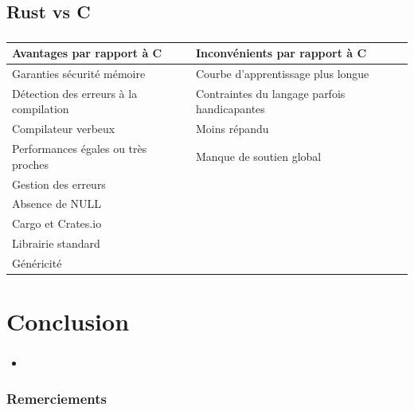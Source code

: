 \documentclass[10pt]{beamer}
\begin{document}
\subsection{Rust vs C}
\begin{frame}
    \frametitle{\subsecname}
    \begin{center}
        \begin{tabularx}{11cm}{|X|X|} \hline
            \textbf{Avantages par rapport à C} & \textbf{Inconvénients par rapport à C} \\ \hline
            Garanties sécurité mémoire & Courbe d'apprentissage plus longue \\ \hline
            Détection des erreurs à la compilation & Contraintes du langage parfois handicapantes \\ \hline
            Compilateur verbeux & Moins répandu \\ \hline
            Performances égales ou très proches & Manque de soutien global \\ \hline
            Gestion des erreurs &  \\ \hline
            Absence de NULL &  \\ \hline
            Cargo et Crates.io &  \\ \hline
            Librairie standard &  \\ \hline
            Généricité &  \\ \hline
        \end{tabularx}
    \end{center}
\end{frame}

\section{Conclusion}
\begin{frame}
    \frametitle{\secname}
    \begin{itemize}
        \item 
    \end{itemize}
\end{frame}

\begin{frame}
    \frametitle{Remerciements}
\end{frame}
\end{document}
